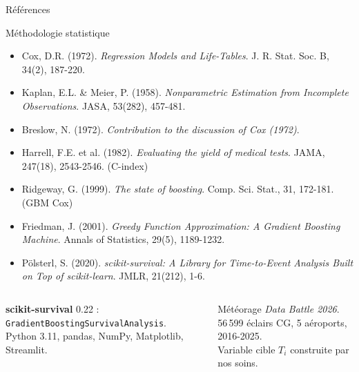 \documentclass[aspectratio=169,t,11pt]{beamer}
\begin{document}
\begin{frame}{Références}
\vspace{-4pt}
\begin{block}{Méthodologie statistique}
\scriptsize
\begin{itemize}\setlength\itemsep{0pt}
  \item Cox, D.R. (1972). \textit{Regression Models and Life-Tables}.
    J. R. Stat. Soc. B, 34(2), 187-220.
  \item Kaplan, E.L. \& Meier, P. (1958). \textit{Nonparametric Estimation from
    Incomplete Observations}. JASA, 53(282), 457-481.
  \item Breslow, N. (1972). \textit{Contribution to the discussion of Cox (1972)}.
  \item Harrell, F.E. et al. (1982). \textit{Evaluating the yield of medical tests}.
    JAMA, 247(18), 2543-2546. \hfill (C-index)
  \item Ridgeway, G. (1999). \textit{The state of boosting}.
    Comp. Sci. Stat., 31, 172-181. \hfill (GBM Cox)
  \item Friedman, J. (2001). \textit{Greedy Function Approximation: A Gradient
    Boosting Machine}. Annals of Statistics, 29(5), 1189-1232.
  \item Pölsterl, S. (2020). \textit{scikit-survival: A Library for Time-to-Event
    Analysis Built on Top of scikit-learn}. JMLR, 21(212), 1-6.
\end{itemize}
\end{block}
\vspace{2pt}
\begin{columns}[T]
\begin{tcolorbox}[mybox,colback=metMid!10,colframe=metMid,title={Logiciels}]
\scriptsize
\textbf{scikit-survival} 0.22 : \texttt{GradientBoostingSurvivalAnalysis}.\\
Python 3.11, pandas, NumPy, Matplotlib, Streamlit.
\end{tcolorbox}
\begin{tcolorbox}[mybox,colback=metOrange!10,colframe=metOrange,title={Données}]
\footnotesize
Météorage \textit{Data Battle 2026}.\\
56\,599 éclairs CG, 5 aéroports, 2016-2025.\\
Variable cible $T_i$ construite par nos soins.
\end{tcolorbox}
\end{columns}
\end{frame}
\end{document}
